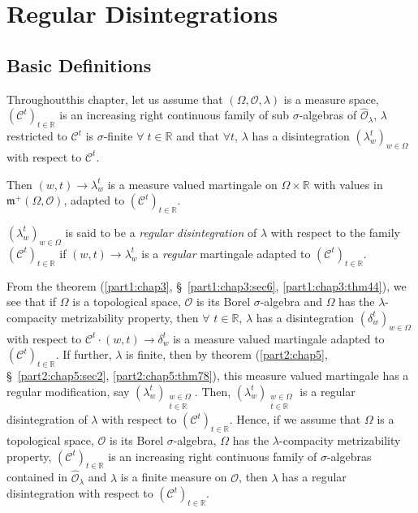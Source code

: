 
\chapter{Regular Disintegrations}\label{part2:chap6}

\section{Basic Definitions}\label{part2:chap6:sec1}


Throughout\pageoriginale this chapter, let us assume that $(\Omega,
\mathscr{O},\lambda)$ is a measure space, $(\mathscr{C}^t)_{t \in
  \mathbb{R}}$ is an increasing right continuous family of sub
$\sigma$-algebras of $\hat{\mathscr{O}}_\lambda$, $\lambda$ restricted
to $\mathscr{C}^t$ is $\sigma$-finite $\forall \; t\in \mathbb{R}$ and
that $\forall t$, $\lambda$ has a disintegration $(\lambda^t_w)_{w \in
\Omega}$ with respect to $\mathscr{C}^t$.

Then $(w,t) \to \lambda^t_w$ is a measure valued martingale on $\Omega
\times \mathbb{R}$ with values in $\mathfrak{m}^+
(\Omega,\mathscr{O})$, adapted to $(\mathscr{C}^t)_{t \in\mathbb{R}}$. 
 
\begin{defn}\label{part2:chap6:def84}
$(\lambda^t_w)_{w \in \Omega}$ is said to be a {\em regular
    disintegration} of $\lambda$ with respect to the family
  $(\mathscr{C}^t)_{t \in\mathbb{R}}$ if $(w,t) \to \lambda^t_w$ is a
  {\em regular} martingale adapted to $(\mathscr{C}^t)_{t \in
    \mathbb{R}}$. 

From the theorem (\ref{part1:chap3}, \S\ \ref{part1:chap3:sec6},
\ref{part1:chap3:thm44}), we see that if $\Omega$ is a 
topological space, $\mathscr{O}$ is its Borel $\sigma$-algebra and
$\Omega$ has the $\lambda$-compacity metrizability property, then
$\forall$ $t \in \mathbb{R}$, $\lambda$ has a disintegration
$(\delta^t_w)_{w \in\Omega}$ with respect to $\mathscr{C}^t  \cdot
(w,t) \to \delta^t_w$ is a measure valued martingale adapted to
$(\mathscr{C}^t)_{t \in \mathbb{R}}$. If further, $\lambda$ is finite,
then by theorem (\ref{part2:chap5}, \S\ \ref{part2:chap5:sec2},
\ref{part2:chap5:thm78}), this measure valued martingale has a 
regular modification, say $(\lambda^t_w)_{\substack{w \in \Omega\\ t
    \in \mathbb{R}}}$. Then, $(\lambda^t_w)_{\substack{w \in \Omega\\t
\in \mathbb{R}}}$ is a regular disintegration of $\lambda$ with
respect to $(\mathscr{C}^t)_{t \in \mathbb{R}}$. Hence, if we assume
that $\Omega$ is a topological space, $\mathscr{O}$ is its Borel
$\sigma$-algebra, $\Omega$ has the $\lambda$-compacity metrizability
property, $(\mathscr{C}^t)_{t \in \mathbb{R}}$ is an increasing right
continuous family of $\sigma$-algebras contained in
$\hat{\mathscr{O}}_\lambda$ and $\lambda$ is a finite measure on
$\mathscr{O}$, then $\lambda$ has a regular disintegration with
respect to $(\mathscr{C}^t)_{t \in \mathbb{R}}$. 
\end{defn}


